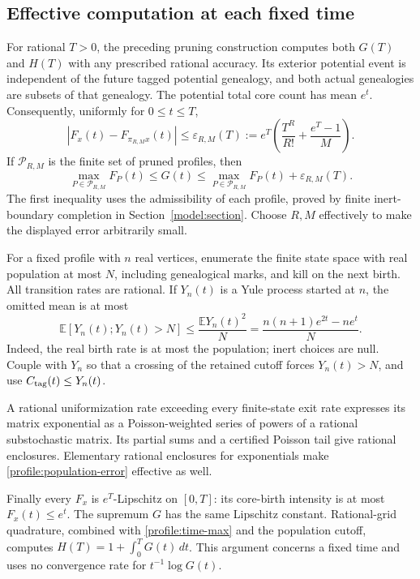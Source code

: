 \subsection{Effective computation at each fixed time}
\label{profile:time}

For rational $T>0$, the preceding pruning construction computes both
$G(T)$ and $H(T)$ with any prescribed rational accuracy. Its exterior
potential event is independent of the future tagged potential
genealogy, and both actual genealogies are subsets of that genealogy.
The potential total core count has mean $e^t$. Consequently, uniformly
for $0\le t\le T$,
\begin{equation}\label{profile:time-error}
 |F_x(t)-F_{\pi_{R,M}x}(t)|
 \le \varepsilon_{R,M}(T)
 :=e^T\left(\frac{T^R}{R!}+\frac{e^T-1}{M}\right).
\end{equation}
If $\mathcal P_{R,M}$ is the finite set of pruned profiles, then
\begin{equation}\label{profile:time-max}
 \max_{P\in\mathcal P_{R,M}}F_P(t)
 \le G(t)\le
 \max_{P\in\mathcal P_{R,M}}F_P(t)+\varepsilon_{R,M}(T).
\end{equation}
The first inequality uses the admissibility of each profile, proved
by finite inert-boundary completion in Section~\ref{model:section}.
Choose $R,M$ effectively to make the displayed error arbitrarily small.

For a fixed profile with $n$ real vertices, enumerate the finite state
space with real population at most $N$, including genealogical marks,
and kill on the next birth. All transition rates are rational. If
$Y_n(t)$ is a Yule process started at $n$, the omitted mean is at most
\begin{equation}\label{profile:population-error}
 \mathbb E[Y_n(t);Y_n(t)>N]
 \le\frac{\mathbb EY_n(t)^2}{N}
 =\frac{n(n+1)e^{2t}-ne^t}{N}.
\end{equation}
Indeed, the real birth rate is at most the population; inert choices
are null. Couple with $Y_n$ so that a crossing of the retained cutoff
forces $Y_n(t)>N$, and use $C_{\rm tag}(t)\le Y_n(t)$.

A rational uniformization rate exceeding every finite-state exit rate
expresses its matrix exponential as a Poisson-weighted series of
powers of a rational substochastic matrix. Its partial sums and a
certified Poisson tail give rational enclosures. Elementary rational
enclosures for exponentials make \eqref{profile:population-error}
effective as well.

Finally every $F_x$ is $e^T$-Lipschitz on $[0,T]$: its core-birth
intensity is at most $F_x(t)\le e^t$. The supremum $G$ has the same
Lipschitz constant. Rational-grid quadrature, combined with
\eqref{profile:time-max} and the population cutoff, computes
$H(T)=1+\int_0^TG(t)\,dt$. This argument concerns a fixed time and
uses no convergence rate for $t^{-1}\log G(t)$.
